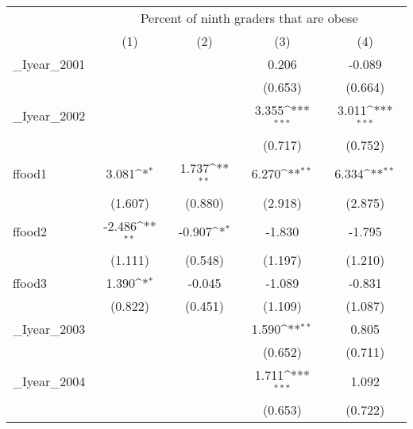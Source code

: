{
\def\sym#1{\ifmmode^{#1}\else\(^{#1}\)\fi}
\begin{tabular}{l*{4}{c}}
\hline\hline
                    &\multicolumn{4}{c}{Percent of ninth graders that are obese }                           \\
                    &\multicolumn{1}{c}{(1)}         &\multicolumn{1}{c}{(2)}         &\multicolumn{1}{c}{(3)}         &\multicolumn{1}{c}{(4)}         \\
\hline
\_Iyear\_2001         &                     &                     &       0.206         &      -0.089         \\
                    &                     &                     &     (0.653)         &     (0.664)         \\
[1em]
\_Iyear\_2002         &                     &                     &       3.355\sym{***}&       3.011\sym{***}\\
                    &                     &                     &     (0.717)         &     (0.752)         \\
[1em]
ffood1              &       3.081\sym{*}  &       1.737\sym{**} &       6.270\sym{**} &       6.334\sym{**} \\
                    &     (1.607)         &     (0.880)         &     (2.918)         &     (2.875)         \\
[1em]
ffood2              &      -2.486\sym{**} &      -0.907\sym{*}  &      -1.830         &      -1.795         \\
                    &     (1.111)         &     (0.548)         &     (1.197)         &     (1.210)         \\
[1em]
ffood3              &       1.390\sym{*}  &      -0.045         &      -1.089         &      -0.831         \\
                    &     (0.822)         &     (0.451)         &     (1.109)         &     (1.087)         \\
[1em]
\_Iyear\_2003         &                     &                     &       1.590\sym{**} &       0.805         \\
                    &                     &                     &     (0.652)         &     (0.711)         \\
[1em]
\_Iyear\_2004         &                     &                     &       1.711\sym{***}&       1.092         \\
                    &                     &                     &     (0.653)         &     (0.722)         \\

\end{tabular}}
